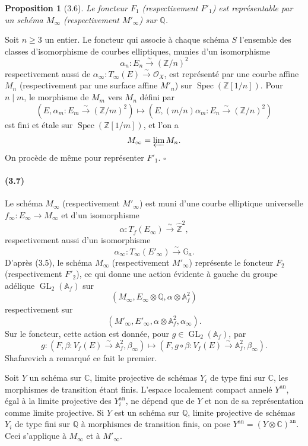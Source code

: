 \documentclass[10pt]{article}
\newcommand{\Af}{\mathbb A_f}
\newcommand{\C}{\mathbb C}
\newcommand{\Q}{\mathbb Q}
\newcommand{\Z}{\mathbb Z}
\newcommand{\bZ}{\widehat{\mathbb Z}}
\newcommand{\Ga}{\mathbb G_a}
\newcommand{\GL}{\operatorname{GL}}
\newcommand{\Spec}{\operatorname{Spec}}
\newcommand{\cO}{\mathcal O}
\newcommand{\an}{\mathrm{an}}
\newcommand{\QED}{\hfill$\square$}
\newtheorem*{proposition}{Proposition}
\begin{document}
\begin{proposition}[3.6]
Le foncteur $F_1$ (respectivement $F'_1$) est représentable par un schéma $M_\infty$
(respectivement $M'_\infty$) sur $\Q$.
\end{proposition}

Soit $n\ge 3$ un entier. Le foncteur qui associe à chaque schéma $S$ l'ensemble des
classes d'isomorphisme de courbes elliptiques, munies d'un isomorphisme
\[
\alpha_n:E_n\xrightarrow{\sim}(\Z/n)^2
\]
respectivement aussi de $\alpha_\infty:T_\infty(E)\xrightarrow{\sim}\cO_X$, est représenté
par une courbe affine $M_n$ (respectivement par une surface affine $M'_n$) sur
$\Spec(\Z[1/n])$. Pour $n\mid m$, le morphisme de $M_m$ vers $M_n$ défini par
\[
(E,\alpha_m:E_m\xrightarrow{\sim}(\Z/m)^2)
\longmapsto
(E,(m/n)\alpha_m:E_n\xrightarrow{\sim}(\Z/n)^2)
\]
est fini et étale sur $\Spec(\Z[1/m])$, et l'on a
\[
M_\infty=\varprojlim M_n .
\]
On procède de même pour représenter $F'_1$. \QED

\paragraph{(3.7)}
Le schéma $M_\infty$ (respectivement $M'_\infty$) est muni d'une courbe elliptique
universelle $f_\infty:E_\infty\to M_\infty$ et d'un isomorphisme
\[
\alpha:T_f(E_\infty)\xrightarrow{\sim}\bZ^2,
\]
respectivement aussi d'un isomorphisme
\[
\alpha_\infty:T_\infty(E'_\infty)\xrightarrow{\sim}\Ga.
\]
D'après (3.5), le schéma $M_\infty$ (respectivement $M'_\infty$) représente le foncteur
$F_2$ (respectivement $F'_2$), ce qui donne une action évidente à gauche du groupe
adélique $\GL_2(\Af)$ sur
\[
(M_\infty,E_\infty\otimes\Q,\alpha\otimes\Af^2)
\]
respectivement sur
\[
(M'_\infty,E'_\infty,\alpha\otimes\Af^2,\alpha_\infty).
\]
Sur le foncteur, cette action est donnée, pour $g\in\GL_2(\Af)$, par
\[
g:(F,\beta:V_f(E)\xrightarrow{\sim}\Af^2,\beta_\infty)
\longmapsto
(F,g\circ\beta:V_f(E)\xrightarrow{\sim}\Af^2,\beta_\infty).
\]
Shafarevich a remarqué ce fait le premier.

Soit $Y$ un schéma sur $\C$, limite projective de schémas $Y_i$ de type fini sur $\C$,
les morphismes de transition étant finis. L'espace localement compact annelé $Y^{\an}$,
égal à la limite projective des $Y_i^{\an}$, ne dépend que de $Y$ et non de sa représentation
comme limite projective. Si $Y$ est un schéma sur $\Q$, limite projective de schémas $Y_i$
de type fini sur $\Q$ à morphismes de transition finis, on pose $Y^{\an}=(Y\otimes\C)^{\an}$.
Ceci s'applique à $M_\infty$ et à $M'_\infty$.
\end{document}
